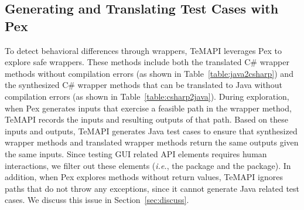 \subsection{Generating and Translating Test Cases with Pex}
\label{sec:evaluation:single}


To detect behavioral differences through wrappers, TeMAPI leverages Pex to explore safe wrappers. These methods include both the translated C\# wrapper methods without compilation errors (as shown in Table~\ref{table:java2csharp}) and the synthesized C\# wrapper methods that can be translated to Java without compilation errors (as shown in Table~\ref{table:csharp2java}). During exploration, when Pex generates inputs that exercise a feasible path in the wrapper method, TeMAPI records the inputs and resulting outputs of that path. Based on these inputs and outputs, TeMAPI generates Java test cases to ensure that synthesized wrapper methods and translated wrapper methods return the same outputs given the same inputs. Since testing GUI related API elements requires human interactions, we filter out these elements (\emph{i.e.}, the  package and the  package). In addition, when Pex explores methods without return values, TeMAPI ignores paths that do not throw any exceptions, since it cannot generate Java related test cases. We discuss this issue in Section~\ref{sec:discuss}.

